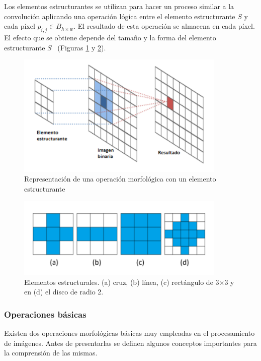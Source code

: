Los elementos estructurantes se utilizan para hacer un proceso similar a la convolución aplicando una operación lógica entre el elemento estructurante $S$ y cada píxel $p_{i, j} \in B_{h \times w}$. El resultado de esta operación se almacena en cada píxel. El efecto que se obtiene depende del tamaño y la forma del elemento estructurante $S$~\cite{castleman1996digital} (Figuras \ref{fig:estructurante} y \ref{fig:kernel}).

\begin{figure}[ht]
	\centering
	\includegraphics[width=10cm]{./Graphics/estructurante.png}
	\caption{Representación de una operación morfológica con un elemento estructurante}
	\label{fig:estructurante}
\end{figure}	

\begin{figure}[ht]
	\centering
	\includegraphics[width=10cm]{./Graphics/kernel.png}
	\caption{Elementos estructurales. (a) cruz, (b) línea, (c) rectángulo de 3$\times$3 y en (d) el disco de radio 2.}
	\label{fig:kernel}
\end{figure}

\subsubsection{Operaciones básicas}

Existen dos operaciones morfológicas básicas  muy empleadas en el procesamiento de imágenes. Antes de presentarlas se definen algunos conceptos importantes para la comprensión de las mismas.

